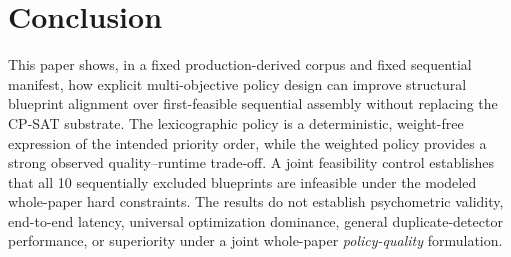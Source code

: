 \documentclass[runningheads]{llncs}
\begin{document}
\section{Conclusion}
This paper shows, in a fixed production-derived corpus and fixed sequential manifest, how explicit multi-objective policy design can improve structural blueprint alignment over first-feasible sequential assembly without replacing the CP-SAT substrate. The lexicographic policy is a deterministic, weight-free expression of the intended priority order, while the weighted policy provides a strong observed quality--runtime trade-off. A joint feasibility control establishes that all 10 sequentially excluded blueprints are infeasible under the modeled whole-paper hard constraints. The results do not establish psychometric validity, end-to-end latency, universal optimization dominance, general duplicate-detector performance, or superiority under a joint whole-paper \emph{policy-quality} formulation.
\end{document}
